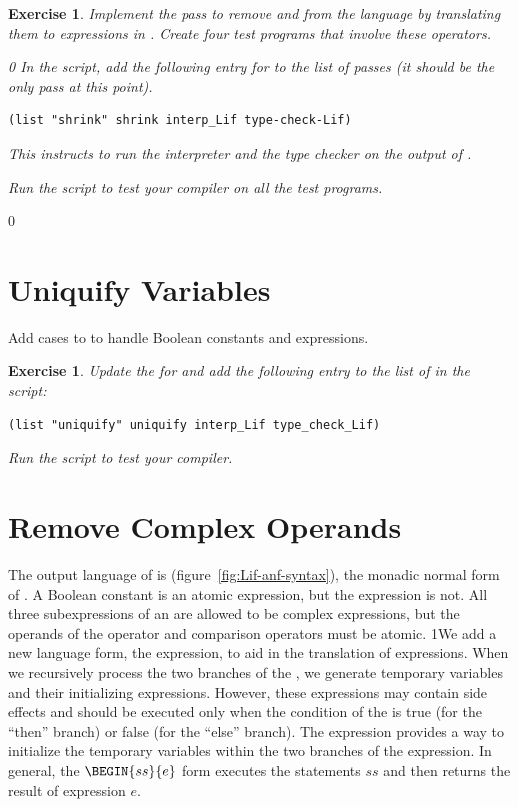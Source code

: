 \documentclass[7x10]{TimesAPriori_MIT}%
\def\racketEd{0}
\def\pythonEd{1}
\providecommand{\BookEdition}{1}
\let\edition\BookEdition
\newcommand{\pythonColor}[0]{}
\newcommand{\python}[1]{{\if\edition\pythonEd\pythonColor #1\fi}}
\newtheorem{exercise}[theorem]{Exercise}
\numberwithin{theorem}{chapter}
\numberwithin{definition}{chapter}
\numberwithin{equation}{chapter}
\begin{document}
\begin{exercise}\normalfont\normalsize
%
Implement the pass  to remove  and  from
the language by translating them to  expressions in \LangIf{}.
%
Create four test programs that involve these operators.
%
{\if\edition\racketEd    
In the  script, add the following entry for
 to the list of passes (it should be the only pass at
this point).
\begin{lstlisting}
(list "shrink" shrink interp_Lif type-check-Lif)
\end{lstlisting}
This instructs  to run the interpreter
 and the type checker  on the
output of .
\fi}
%
Run the script to test your compiler on all the test programs.
\end{exercise}

{\if\edition\racketEd    

\section{Uniquify Variables}
\label{sec:uniquify-Lif}

Add cases to  to handle Boolean constants and
 expressions.

\begin{exercise}\normalfont\normalsize
Update the  for \LangIf{} and add the following
entry to the list of  in the  script:
\begin{lstlisting}
(list "uniquify" uniquify interp_Lif type_check_Lif)
\end{lstlisting}
Run the script to test your compiler.
\end{exercise}

\fi}

\section{Remove Complex Operands}
\label{sec:remove-complex-opera-Lif}

The output language of  is
\LangIfANF{} (figure~\ref{fig:Lif-anf-syntax}), the monadic
normal form of \LangIf{}.  A Boolean constant is an atomic expression,
but the  expression is not.  All three subexpressions of an
 are allowed to be complex expressions, but the operands of
the  operator and comparison operators must be atomic.
%
\python{We add a new language form, the  expression, to aid
  in the translation of \code{if} expressions. When we recursively
  process the two branches of the \code{if}, we generate temporary
  variables and their initializing expressions. However, these
  expressions may contain side effects and should be executed only
  when the condition of the \code{if} is true (for the ``then''
  branch) or false (for the ``else'' branch). The \code{Begin} expression
  provides a way to initialize the temporary variables within the two branches
  of the \code{if} expression.  In general, the $\BEGIN{ss}{e}$
  form executes the statements $ss$ and then returns the result of
  expression $e$.}
\end{document}
